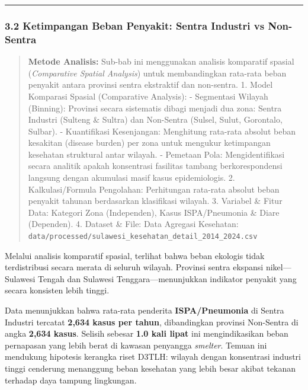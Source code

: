\documentclass[
]{article}
\begin{document}
\begin{center}\rule{0.5\linewidth}{0.5pt}\end{center}

\subsubsection{3.2 Ketimpangan Beban Penyakit: Sentra Industri vs
Non-Sentra}\label{ketimpangan-beban-penyakit-sentra-industri-vs-non-sentra}

\begin{quote}
\textbf{Metode Analisis:} Sub-bab ini menggunakan analisis komparatif
spasial (\emph{Comparative Spatial Analysis}) untuk membandingkan
rata-rata beban penyakit antara provinsi sentra ekstraktif dan
non-sentra. 1. Model Komparasi Spasial (Comparative Analysis): -
Segmentasi Wilayah (Binning): Provinsi secara sistematis dibagi menjadi
dua zona: Sentra Industri (Sulteng \& Sultra) dan Non-Sentra (Sulsel,
Sulut, Gorontalo, Sulbar). - Kuantifikasi Kesenjangan: Menghitung
rata-rata absolut beban kesakitan (disease burden) per zona untuk
mengukur ketimpangan kesehatan struktural antar wilayah. - Pemetaan
Pola: Mengidentifikasi secara analitik apakah konsentrasi fasilitas
tambang berkorespondensi langsung dengan akumulasi masif kasus
epidemiologis. 2. Kalkulasi/Formula Pengolahan: Perhitungan rata-rata
absolut beban penyakit tahunan berdasarkan klasifikasi wilayah. 3.
Variabel \& Fitur Data: Kategori Zona (Independen), Kasus ISPA/Pneumonia
\& Diare (Dependen). 4. Dataset \& File: Data Agregasi Kesehatan:
\texttt{data/processed/sulawesi\_kesehatan\_detail\_2014\_2024.csv}
\end{quote}

Melalui analisis komparatif spasial, terlihat bahwa beban ekologis tidak
terdistribusi secara merata di seluruh wilayah. Provinsi sentra ekspansi
nikel---Sulawesi Tengah dan Sulawesi Tenggara---menunjukkan indikator
penyakit yang secara konsisten lebih tinggi.

Data menunjukkan bahwa rata-rata penderita \textbf{ISPA/Pneumonia} di
Sentra Industri tercatat \textbf{2,634 kasus per tahun}, dibandingkan
provinsi Non-Sentra di angka \textbf{2,634 kasus}. Selisih sebesar
\textbf{1.0 kali lipat} ini mengindikasikan beban pernapasan yang lebih
berat di kawasan penyangga \emph{smelter}. Temuan ini mendukung
hipotesis kerangka riset D3TLH: wilayah dengan konsentrasi industri
tinggi cenderung menanggung beban kesehatan yang lebih besar akibat
tekanan terhadap daya tampung lingkungan.
\end{document}

